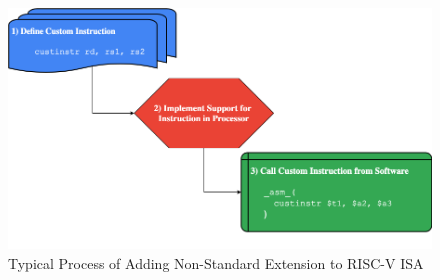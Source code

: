 \begin{figure}[H]
\begin{center}
\includegraphics[width=0.9\linewidth]{chapters/chapter1/img/extendingRISCV.png}
\caption{Typical Process of Adding Non-Standard Extension to RISC-V ISA}
\label{fig:extendingRISCV}
\end{center}
\end{figure}